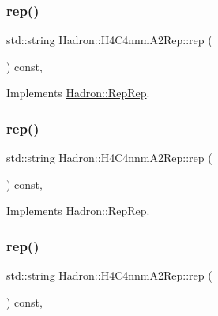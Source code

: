 \subsubsection{\texorpdfstring{rep()}{rep()}\hspace{0.1cm}{\footnotesize\ttfamily [1/3]}}
{\footnotesize\ttfamily std\+::string Hadron\+::\+H4\+C4nnm\+A2\+Rep\+::rep (\begin{DoxyParamCaption}{ }\end{DoxyParamCaption}) const\hspace{0.3cm}{\ttfamily [inline]}, {\ttfamily [virtual]}}



Implements \mbox{\hyperlink{structHadron_1_1RepRep_ab3213025f6de249f7095892109575fde}{Hadron\+::\+Rep\+Rep}}.

\mbox{\label{structHadron_1_1H4C4nnmA2Rep_a8a7be6ed1396d06723b3d7891b6ab5a8}} 
\subsubsection{\texorpdfstring{rep()}{rep()}\hspace{0.1cm}{\footnotesize\ttfamily [2/3]}}
{\footnotesize\ttfamily std\+::string Hadron\+::\+H4\+C4nnm\+A2\+Rep\+::rep (\begin{DoxyParamCaption}{ }\end{DoxyParamCaption}) const\hspace{0.3cm}{\ttfamily [inline]}, {\ttfamily [virtual]}}



Implements \mbox{\hyperlink{structHadron_1_1RepRep_ab3213025f6de249f7095892109575fde}{Hadron\+::\+Rep\+Rep}}.

\mbox{\label{structHadron_1_1H4C4nnmA2Rep_a8a7be6ed1396d06723b3d7891b6ab5a8}} 
\subsubsection{\texorpdfstring{rep()}{rep()}\hspace{0.1cm}{\footnotesize\ttfamily [3/3]}}
{\footnotesize\ttfamily std\+::string Hadron\+::\+H4\+C4nnm\+A2\+Rep\+::rep (\begin{DoxyParamCaption}{ }\end{DoxyParamCaption}) const\hspace{0.3cm}{\ttfamily [inline]}, {\ttfamily [virtual]}}



